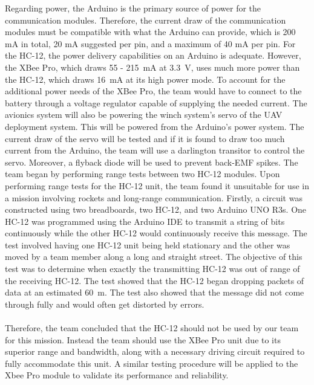 Regarding power, the Arduino is the primary source of power for the communication modules. Therefore, the current draw of the communication modules must be compatible with what the Arduino can provide, which is 200 mA in total, 20 mA suggested per pin, and a maximum of 40 mA per pin. For the HC-12, the power delivery capabilities on an Arduino is adequate. However, the XBee Pro, which draws 55 - \SI{215}{\milli\ampere} at \SI{3.3}{\volt}, uses much more power than the HC-12, which draws \SI{16}{\milli\ampere} at its high power mode. To account for the additional power needs of the XBee Pro, the team would have to connect to the battery through a voltage regulator capable of supplying the needed current. The avionics system will also be powering the winch system's servo of the UAV deployment system. This will be powered from the Arduino's power system. The current draw of the servo will be tested and if it is found to draw too much current from the Arduino, the team will use a darlington transitor to control the servo. Moreover, a flyback diode will be used to prevent back-EMF spikes. The team began by performing range tests between two HC-12 modules.
Upon performing range tests for the HC-12 unit, the team found it unsuitable for use in a mission involving rockets and long-range communication. Firstly, a circuit was constructed using two breadboards, two HC-12, and two Arduino UNO R3s. One HC-12 was programmed using the Arduino IDE to transmit a string of bits continuously while the other HC-12 would continuously receive this message. The test involved having one HC-12 unit being held stationary and the other was moved by a team member along a long and straight street. The objective of this test was to determine when exactly the transmitting HC-12 was out of range of the receiving HC-12. The test showed that the HC-12 began dropping packets of data at an estimated \SI{60}{\meter}. The test also showed that the message did not come through fully and would often get distorted by errors.
\\\\
Therefore, the team concluded that the HC-12 should not be used by our team for this mission. Instead the team should use the XBee Pro unit due to its superior range and bandwidth, along with a necessary driving circuit required to fully accommodate this unit. A similar testing procedure will be applied to the Xbee Pro module to validate its performance and reliability.
